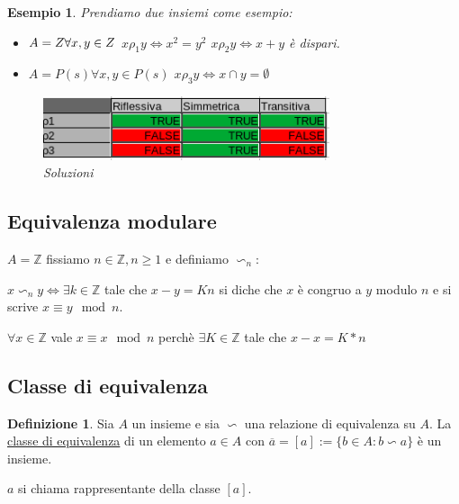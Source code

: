 \documentclass{article}
\newtheorem{exmp}{Esempio}[section]
\theoremstyle{definition}
\newtheorem{definition}{Definizione}[section]
\begin{document}
\begin{exmp}
        Prendiamo due insiemi come esempio:
        \begin{itemize}
                \item $ A = Z \newline \forall x, y \in Z $ \newline 
                        $ x \rho_1 y \Leftrightarrow x^2 = y^2$ \newline 
                        $ x \rho_2 y \Leftrightarrow x + y $ è dispari.
                \item $ A = P(s) \forall x,y \in P(s) $ \newline
                        $ x \rho_3 y \Leftrightarrow x \cap y = \emptyset $ 
        \end{itemize}
        \begin{figure}[h]
                \centering
                        \includegraphics[width=0.75\textwidth]{esempio_relazione_dordine.png}
                        \caption{Soluzioni}\label{fig:esempio_relazione_dordine}
        \end{figure}        
\end{exmp}


\subsection{Equivalenza modulare}\label{sec:equivalenza_modulare}
$A = \mathbb{Z}$ fissiamo $n \in \mathbb{Z}, n \geq 1$ e definiamo $\backsim_n$: \par

\begin{tcolorbox}
$x \backsim_n y \Leftrightarrow \exists k \in \mathbb{Z}$ tale che $x-y = Kn$ si diche che $x$ è congruo a $y$ modulo $n$ e si scrive $x \equiv y \mod n$. \par
$\forall x \in \mathbb{Z}$ vale $x \equiv x \mod n$ perchè $\exists K \in \mathbb{Z}$ tale che $x-x = K*n$ 
\end{tcolorbox}


\subsection{Classe di equivalenza}\label{sec:classe_di_equivalenza}
\begin{definition}
Sia $A$ un insieme e sia $\backsim$ una relazione di equivalenza su $A$. La \underline{classe di equivalenza} di un elemento $a \in A$ con $\overline{a} = [a] := \{b\in A : b \backsim a\}$ è un insieme. \par
\end{definition}
$a$ si chiama rappresentante della classe $[a]$. \par
\end{document}
